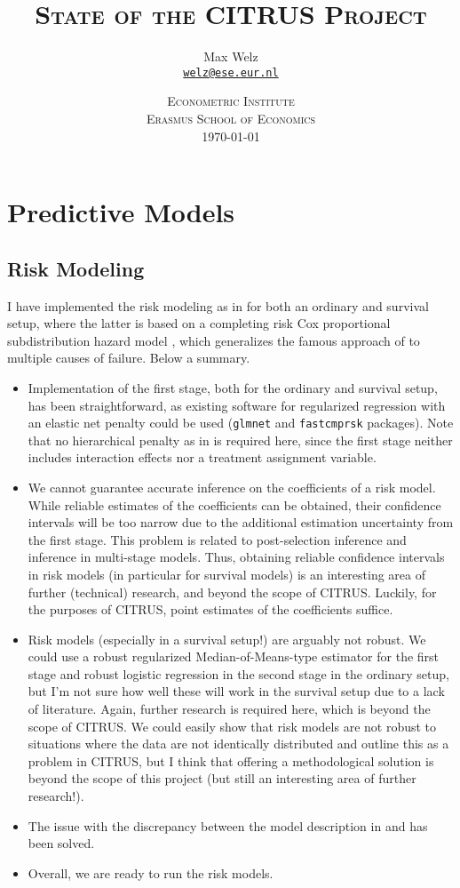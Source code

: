 \documentclass[11pt]{article}
\title{\textsc{State of the CITRUS Project}}
\author{Max Welz \\
  \href{mailto:welz@ese.eur.nl}{\texttt{welz@ese.eur.nl}}}
\date{%
    \textsc{Econometric Institute\\ Erasmus School of Economics}\\[2ex]%
    \today}
\begin{document}
\maketitle

\section{Predictive Models}
\subsection{Risk Modeling}
I have implemented the risk modeling as in \cite{kent2020path} for both an ordinary and survival setup, where the latter is based on a completing risk Cox proportional subdistribution hazard  model \citep{fine1999proportional}, which generalizes the famous approach of \cite{cox1972} to multiple causes of failure. Below a summary.
\begin{itemize}
	\item Implementation of the first stage, both for the ordinary and survival setup, has been straightforward, as existing software for regularized regression with an elastic net penalty \citep{zou2005} could be used (\texttt{glmnet} and \texttt{fastcmprsk} packages). Note that no hierarchical penalty as in \cite{bien2013} is required here, since the first stage neither includes interaction effects nor a treatment assignment variable. 
	\item We cannot guarantee accurate inference on the coefficients of a risk model. While reliable estimates of the coefficients can be obtained, their confidence intervals will be too narrow due to the additional estimation uncertainty from the first stage. This problem is related to post-selection inference and inference in multi-stage models. Thus, obtaining reliable confidence intervals in risk models (in particular for survival models) is an interesting area of further (technical) research, and beyond the scope of CITRUS. Luckily, for the purposes of CITRUS, point estimates of the coefficients suffice.
	\item Risk models (especially in a survival setup!) are arguably not robust. We could use a robust regularized Median-of-Means-type estimator \citep{lecue2020} for the first stage and robust logistic regression in the second stage in the ordinary setup, but I'm not sure how well these will work in the survival setup due to a lack of literature. Again, further research is required here, which is beyond the scope of CITRUS. We could easily show that risk models are not robust to situations where the data are not identically distributed and outline this as a problem in CITRUS, but I think that offering a methodological solution is beyond the scope of this project (but still an interesting area of further research!).
	\item The issue with the discrepancy between the model description in \cite{rekkas2019} and \cite{kent2020path} has been solved.
	\item Overall, we are ready to run the risk models.
\end{itemize}
\end{document}

